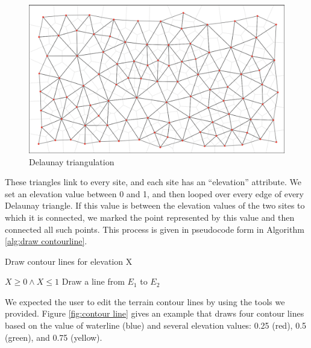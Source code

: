 \begin{figure}[htbp]
  \centering
  \includegraphics[width=\textwidth]{section04/assets/Map-delaunay-triangulation.png}
  \caption{Delaunay triangulation}
  \label{fig:Delaunay triangulation}
\end{figure}

These triangles link to every site, and each site has an ``elevation'' attribute. We set an elevation value between 0 and 1, and then looped over every edge of every Delaunay triangle. If this value is between the elevation values of the two sites to which it is connected, we marked the point represented by this value and then connected all such points. This process is given in pseudocode form in Algorithm \ref{alg:draw contourline}.

\begin{algorithm}
\caption{Draw contour lines for elevation X}
\label{alg:draw contourline}
\begin{algorithmic}
\REQUIRE $X \geq 0 \wedge X \leq 1$
\STATE Draw a line from $E_1$ to $E_2$
\ENDIF
\ENDFOR
\ENDFOR
\end{algorithmic}
\end{algorithm}

We expected the user to edit the terrain contour lines by using the tools we provided. Figure \ref{fig:contour line} gives an example that draws four contour lines based on the value of waterline (blue) and several elevation values: 0.25 (red), 0.5 (green), and 0.75 (yellow).


